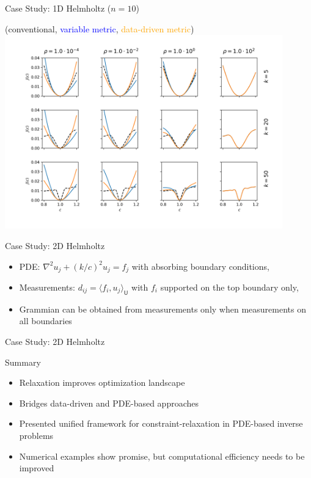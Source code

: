 \documentclass{beamer}
\newcommand{\sU}{\mathsf{U}}
\begin{document}
\begin{frame}{Case Study: 1D Helmholtz ($n=10$)}
  \begin{center}
(conventional, \textcolor{blue}{variable metric}, \textcolor{orange}{data-driven metric})
\includegraphics[width=0.9\textwidth]{../paper/figures/Helmholtz1D_10.png}
  \end{center}
\end{frame}

\begin{frame}{Case Study: 2D Helmholtz}
\begin{itemize}
  \item PDE: $\nabla^2 u_j + (k/c)^2u_j = f_j$ with absorbing boundary conditions,
  \item Measurements: $d_{ij} = \langle f_i, u_j\rangle_\sU$ with $f_i$ supported on the top boundary only,
  \item Grammian can be obtained from measurements only when measurements on all boundaries
\end{itemize}
\end{frame}

\begin{frame}{Case Study: 2D Helmholtz}
\end{frame}

\begin{frame}{Summary}
\begin{itemize}
  \item Relaxation improves optimization landscape
  \item Bridges data-driven and PDE-based approaches
  \item Presented unified framework for constraint-relaxation in PDE-based inverse problems
  \item Numerical examples show promise, but computational efficiency needs to be improved
\end{itemize}
\end{frame}
\end{document}
